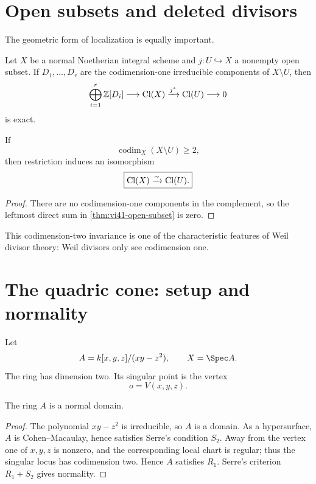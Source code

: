 \section{Open subsets and deleted divisors}

The geometric form of localization is equally important.

\begin{theorem}\label{thm:vi41-open-subset}
Let \(X\) be a normal Noetherian integral scheme and \(j:U\hookrightarrow X\) a nonempty open subset. If \(D_1,\ldots,D_r\) are the codimension-one irreducible components of \(X\setminus U\), then
\[
 \bigoplus_{i=1}^r\mathbb Z[D_i]
 \longrightarrow
 \operatorname{Cl}(X)
 \xrightarrow{j^*}
 \operatorname{Cl}(U)
 \longrightarrow0
\]
is exact.
\end{theorem}

\begin{corollary}\label{cor:vi41-codim-two-invariance}
If
\[
  \operatorname{codim}_X(X\setminus U)\ge2,
\]
then restriction induces an isomorphism
\[
  \boxed{\operatorname{Cl}(X)\xrightarrow{\sim}\operatorname{Cl}(U).}
\]
\end{corollary}

\begin{proof}
There are no codimension-one components in the complement, so the leftmost direct sum in \cref{thm:vi41-open-subset} is zero.
\end{proof}

This codimension-two invariance is one of the characteristic features of Weil divisor theory: Weil divisors only see codimension one.

\section{The quadric cone: setup and normality}

Let
\[
  A=k[x,y,z]/(xy-z^2),
  \qquad
  X=\Spec A.
\]
The ring has dimension two. Its singular point is the vertex
\[
  o=V(x,y,z).
\]

\begin{proposition}\label{prop:vi41-cone-normal}
The ring \(A\) is a normal domain.
\end{proposition}

\begin{proof}
The polynomial \(xy-z^2\) is irreducible, so \(A\) is a domain. As a hypersurface, \(A\) is Cohen--Macaulay, hence satisfies Serre's condition \(S_2\). Away from the vertex one of \(x,y,z\) is nonzero, and the corresponding local chart is regular; thus the singular locus has codimension two. Hence \(A\) satisfies \(R_1\). Serre's criterion \(R_1+S_2\) gives normality.
\end{proof}

